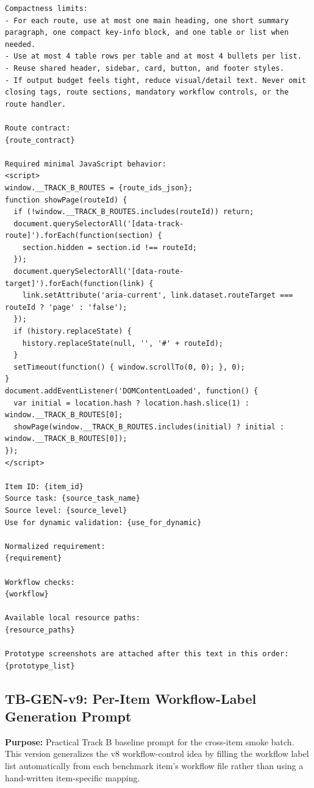 \begin{verbatim}
Compactness limits:
- For each route, use at most one main heading, one short summary paragraph, one compact key-info block, and one table or list when needed.
- Use at most 4 table rows per table and at most 4 bullets per list.
- Reuse shared header, sidebar, card, button, and footer styles.
- If output budget feels tight, reduce visual/detail text. Never omit closing tags, route sections, mandatory workflow controls, or the route handler.

Route contract:
{route_contract}

Required minimal JavaScript behavior:
<script>
window.__TRACK_B_ROUTES = {route_ids_json};
function showPage(routeId) {
  if (!window.__TRACK_B_ROUTES.includes(routeId)) return;
  document.querySelectorAll('[data-track-route]').forEach(function(section) {
    section.hidden = section.id !== routeId;
  });
  document.querySelectorAll('[data-route-target]').forEach(function(link) {
    link.setAttribute('aria-current', link.dataset.routeTarget === routeId ? 'page' : 'false');
  });
  if (history.replaceState) {
    history.replaceState(null, '', '#' + routeId);
  }
  setTimeout(function() { window.scrollTo(0, 0); }, 0);
}
document.addEventListener('DOMContentLoaded', function() {
  var initial = location.hash ? location.hash.slice(1) : window.__TRACK_B_ROUTES[0];
  showPage(window.__TRACK_B_ROUTES.includes(initial) ? initial : window.__TRACK_B_ROUTES[0]);
});
</script>

Item ID: {item_id}
Source task: {source_task_name}
Source level: {source_level}
Use for dynamic validation: {use_for_dynamic}

Normalized requirement:
{requirement}

Workflow checks:
{workflow}

Available local resource paths:
{resource_paths}

Prototype screenshots are attached after this text in this order:
{prototype_list}
\end{verbatim}
\endgroup

\subsection{TB-GEN-v9: Per-Item Workflow-Label Generation Prompt}
\label{app:prompt-tb-gen-v9}

\textbf{Purpose:} Practical Track B baseline prompt for the cross-item smoke
batch. This version generalizes the v8 workflow-control idea by filling the
workflow label list automatically from each benchmark item's workflow file
rather than using a hand-written item-specific mapping.

